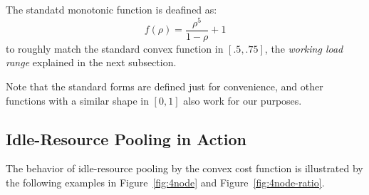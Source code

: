 The standatd monotonic function is deafined as:
\begin{equation*}
	f(\rho) = \frac{\rho^{5}}{1 - \rho} + 1
\end{equation*}
to roughly match the standard convex function in $[.5, .75]$,
the {\em working load range} explained in the next subsection.

Note that the standard forms are defined just for convenience, and
other functions with a similar shape in $[0,1]$ also work for our
purposes.

\subsection{Idle-Resource Pooling in Action}

The behavior of idle-resource pooling by the convex cost function is
illustrated by the following examples in Figure~\ref{fig:4node} and
Figure~\ref{fig:4node-ratio}.

